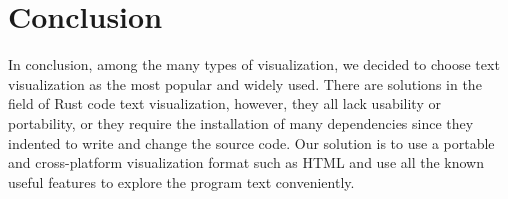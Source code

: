 \section{Conclusion}
\label{sec:conc}

In conclusion, among the many types of visualization, we decided to choose text visualization as the most popular and widely used. 
There are solutions in the field of Rust code text visualization, however, they all lack usability or portability, or they require the installation of many dependencies since they indented to write and change the source code.
Our solution is to use a portable and cross-platform visualization format such as HTML and use all the known useful features to explore the program text conveniently.

\newpage

